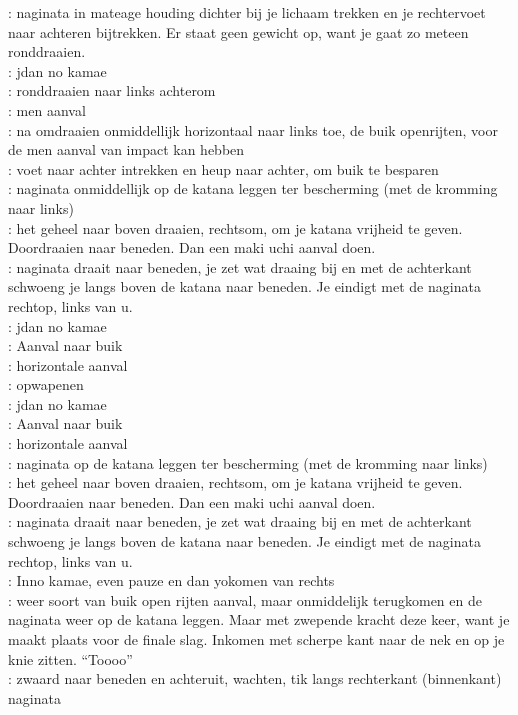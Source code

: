 \pB: naginata in mateage houding dichter bij je lichaam trekken en je rechtervoet naar achteren bijtrekken. Er staat geen gewicht op, want je gaat zo meteen ronddraaien.\\
\pA: jdan no kamae\\
\pB: ronddraaien naar links achterom\\
\pA: men aanval\\
\pB: na omdraaien onmiddellijk horizontaal naar links toe, de buik openrijten, voor de men aanval van \pa impact kan hebben\\
\pA: voet naar achter intrekken en heup naar achter, om buik te besparen\\
\pB: naginata onmiddellijk op de katana leggen ter bescherming (met de kromming naar links)\\
\pA: het geheel naar boven draaien, rechtsom, om je katana vrijheid te geven. Doordraaien naar beneden. Dan een maki uchi aanval doen.\\
\pB: naginata draait naar beneden, je zet wat draaing bij en met de achterkant schwoeng je langs boven de katana naar beneden. Je eindigt met de naginata rechtop, links van u.\\
\pA: jdan no kamae\\
\pB: Aanval naar buik\\
\pA: horizontale aanval\\ 
\pB: opwapenen\\
\pA: jdan no kamae\\
\pB: Aanval naar buik\\
\pA: horizontale aanval\\ 
\pB: naginata op de katana leggen ter bescherming (met de kromming naar links)\\
\pA: het geheel naar boven draaien, rechtsom, om je katana vrijheid te geven. Doordraaien naar beneden. Dan een maki uchi aanval doen.\\
\pB: naginata draait naar beneden, je zet wat draaing bij en met de achterkant schwoeng je langs boven de katana naar beneden. Je eindigt met de naginata rechtop, links van u.\\
\pA: Inno kamae, even pauze en dan yokomen van rechts\\
\pB: weer soort van buik open rijten aanval, maar onmiddelijk terugkomen en de naginata weer op de katana leggen. Maar met zwepende kracht deze keer, want je maakt plaats voor de finale slag. Inkomen met scherpe kant naar de nek en op je knie zitten. ``Toooo''\\
\pA: zwaard naar beneden en achteruit, wachten, tik langs rechterkant (binnenkant) naginata


